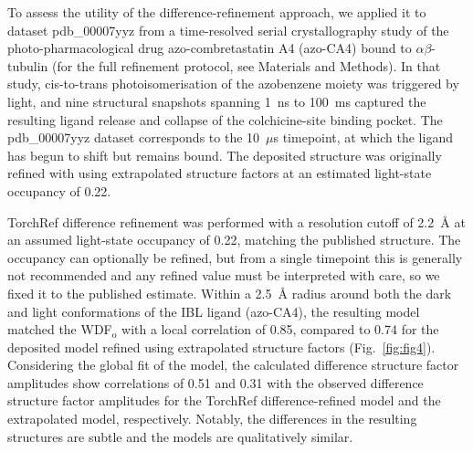 \documentclass{iucrjournals}
\begin{document}
To assess the utility of the difference-refinement approach, we applied it to
dataset pdb\_00007yyz from a time-resolved serial crystallography study of the
photo-pharmacological drug azo-combretastatin A4 (azo-CA4) bound to
$\alpha\beta$-tubulin \cite{wranik_watching_2023} (for the full refinement
protocol, see Materials and Methods).
In that study, cis-to-trans photoisomerisation of the azobenzene moiety was
triggered by light, and nine structural snapshots spanning 1~ns to 100~ms
captured the resulting ligand release and collapse of the colchicine-site
binding pocket.
The pdb\_00007yyz dataset corresponds to the 10~$\mu$s timepoint, at which the ligand
has begun to shift but remains bound.
The deposited structure was originally refined with  using extrapolated
structure factors at an estimated light-state occupancy of 0.22.

TorchRef difference refinement was performed with a resolution cutoff of
2.2~\AA{} at an assumed light-state occupancy of 0.22, matching the published
structure. The occupancy can optionally be refined, but from a single timepoint
this is generally not recommended and any refined value must be interpreted with
care, so we fixed it to the published estimate.
Within a 2.5~\AA{} radius around both the dark and light conformations of the
IBL ligand (azo-CA4), the resulting model matched the WDF$_\mathrm{o}$ with a
local correlation of 0.85, compared to 0.74 for the deposited model refined
using extrapolated structure factors (Fig.\ \ref{fig:fig4}).
Considering the global fit of the model, the calculated difference structure
factor amplitudes show correlations of 0.51 and 0.31 with the observed
difference structure factor amplitudes for the TorchRef difference-refined
model and the extrapolated model, respectively.
Notably, the differences in the resulting structures are subtle and the models
are qualitatively similar.
\end{document}
